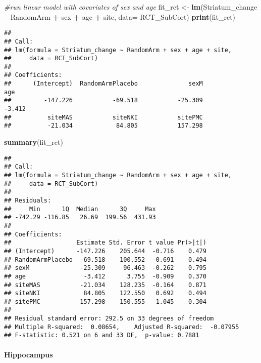 \documentclass[]{article}
\newenvironment{Shaded}{\begin{snugshade}}{\end{snugshade}}
\newcommand{\KeywordTok}[1]{\textcolor[rgb]{0.13,0.29,0.53}{\textbf{#1}}}
\newcommand{\DataTypeTok}[1]{\textcolor[rgb]{0.13,0.29,0.53}{#1}}
\newcommand{\StringTok}[1]{\textcolor[rgb]{0.31,0.60,0.02}{#1}}
\newcommand{\CommentTok}[1]{\textcolor[rgb]{0.56,0.35,0.01}{\textit{#1}}}
\newcommand{\OperatorTok}[1]{\textcolor[rgb]{0.81,0.36,0.00}{\textbf{#1}}}
\newcommand{\NormalTok}[1]{#1}
\let\oldparagraph\paragraph
\renewcommand{\paragraph}[1]{\oldparagraph{#1}\mbox{}}
\theoremstyle{definition}
\theoremstyle{definition}
\theoremstyle{definition}
\theoremstyle{remark}
\begin{document}
\begin{Shaded}
\begin{Highlighting}[]
\CommentTok{#run linear model with covariates of sex and age}
\NormalTok{  fit_rct <-}\StringTok{ }\KeywordTok{lm}\NormalTok{(Striatum_change }\OperatorTok{~}\StringTok{ }\NormalTok{RandomArm }\OperatorTok{+}\StringTok{ }\NormalTok{sex }\OperatorTok{+}\StringTok{ }\NormalTok{age }\OperatorTok{+}\StringTok{ }\NormalTok{site, }\DataTypeTok{data=}\NormalTok{ RCT_SubCort)}
  \KeywordTok{print}\NormalTok{(fit_rct)}
\end{Highlighting}
\end{Shaded}

\begin{verbatim}
## 
## Call:
## lm(formula = Striatum_change ~ RandomArm + sex + age + site, 
##     data = RCT_SubCort)
## 
## Coefficients:
##      (Intercept)  RandomArmPlacebo              sexM               age  
##         -147.226           -69.518           -25.309            -3.412  
##          siteMAS           siteNKI           sitePMC  
##          -21.034            84.805           157.298
\end{verbatim}

\begin{Shaded}
\begin{Highlighting}[]
  \KeywordTok{summary}\NormalTok{(fit_rct)}
\end{Highlighting}
\end{Shaded}

\begin{verbatim}
## 
## Call:
## lm(formula = Striatum_change ~ RandomArm + sex + age + site, 
##     data = RCT_SubCort)
## 
## Residuals:
##     Min      1Q  Median      3Q     Max 
## -742.29 -116.85   26.69  199.56  431.93 
## 
## Coefficients:
##                  Estimate Std. Error t value Pr(>|t|)
## (Intercept)      -147.226    205.644  -0.716    0.479
## RandomArmPlacebo  -69.518    100.552  -0.691    0.494
## sexM              -25.309     96.463  -0.262    0.795
## age                -3.412      3.755  -0.909    0.370
## siteMAS           -21.034    128.235  -0.164    0.871
## siteNKI            84.805    122.550   0.692    0.494
## sitePMC           157.298    150.555   1.045    0.304
## 
## Residual standard error: 292.5 on 33 degrees of freedom
## Multiple R-squared:  0.08654,    Adjusted R-squared:  -0.07955 
## F-statistic: 0.521 on 6 and 33 DF,  p-value: 0.7881
\end{verbatim}

\paragraph{Hippocampus}\label{hippocampus}
\end{document}
